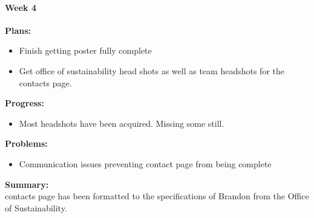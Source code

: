 \paragraph{Week 4}
\begin{adjustwidth}{2.5em}{0pt}
    \vspace{-0.5cm}\textbf{Plans:}
    \vspace{-0.5cm}
    \begin{itemize}
        \item Finish getting poster fully complete
        \item Get office of sustainability head shots as well as team headshots for the contacts page.
    \end{itemize} 
    \vspace{-0.3cm}\textbf{Progress:}
    \vspace{-0.5cm}
    \begin{itemize}
        \item Most headshots have been acquired. Missing some still.
    \end{itemize} 
    \vspace{-0.3cm}\textbf{Problems:}
    \vspace{-0.5cm}
    \begin{itemize}
        \item Communication issues preventing contact page from being complete
    \end{itemize}  
    \vspace{-0.3cm}\noindent\textbf{Summary:}\\
    \noindent contacts page has been formatted to the specifications of Brandon from the Office of Sustainability.
\end{adjustwidth} 
